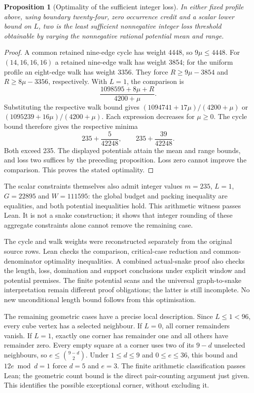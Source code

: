 \documentclass[11pt,a4paper]{article}
\newtheorem{proposition}[theorem]{Proposition}
\theoremstyle{definition}
\theoremstyle{remark}
\begin{document}
\begin{proposition}[Optimality of the sufficient integer loss]
In either fixed profile above, using boundary twenty-four, zero
occurrence credit and a scalar lower bound on $L$, two is the least
sufficient nonnegative integer loss threshold obtainable by varying
the nonnegative rational potential mean and range.
\end{proposition}
\begin{proof}
A common retained nine-edge cycle has weight 4448, so $9\mu\le4448$.
For $(14,16,16,16)$ a retained nine-edge walk has weight 3854;
for the uniform profile an eight-edge walk has weight 3356.
They force $R\ge9\mu-3854$ and $R\ge8\mu-3356$, respectively.
With $L=1$, the comparison is
\[
\frac{1098595+8\mu+R}{4200+\mu}.
\]
Substituting the respective walk bound gives
$(1094741+17\mu)/(4200+\mu)$ or
$(1095239+16\mu)/(4200+\mu)$. Each expression decreases for
$\mu\ge0$. The cycle bound therefore gives the respective minima
\[
235+\frac5{42248},\qquad 235+\frac{39}{42248}.
\]
Both exceed 235. The displayed potentials attain the mean and range
bounds, and loss two suffices by the preceding proposition. Loss zero
cannot improve the comparison. This proves the stated optimality.
\end{proof}

The scalar constraints themselves also admit integer values
$m=235$, $L=1$, $G=22895$ and $W=111595$: the global budget and packing
inequality are equalities, and both potential inequalities hold.
This arithmetic witness passes Lean. It is not a snake construction;
it shows that integer rounding of these aggregate constraints alone
cannot remove the remaining case.

The cycle and walk weights were reconstructed separately from the original
source rows. Lean checks the comparison, critical-case reduction and
common-denominator optimality inequalities. A combined actual-snake proof
also checks the length, loss, domination and support conclusions under
explicit window and potential premises. The finite potential scans
and the universal graph-to-snake interpretation remain different proof
obligations; the latter is still incomplete. No new unconditional length
bound follows from this optimisation.

The remaining geometric cases have a precise local description.
Since $L\le1<96$, every cube vertex has a selected neighbour. If $L=0$,
all corner remainders vanish. If $L=1$, exactly one corner has remainder
one and all others have remainder zero. Every empty square at a corner
uses two of its $9-d$ unselected neighbours, so
$e\le\binom{9-d}{2}$. Under $1\le d\le9$ and $0\le e\le36$,
this bound and $12e\bmod d=1$ force $d=5$ and $e=3$.
The finite arithmetic classification passes Lean; the geometric
count bound is the direct pair-counting argument just given.
This identifies the possible exceptional corner, without excluding it.
\end{document}
